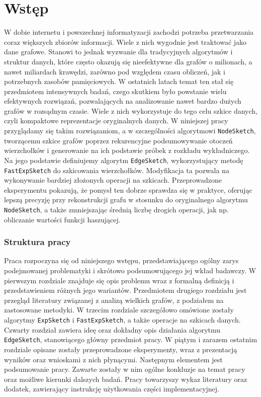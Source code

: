 \chapter*{Wstęp}

W dobie internetu i powszechnej informatyzacji zachodzi potrzeba przetwarzania coraz większych zbiorów informacji. Wiele z nich wygodnie jest traktować jako dane grafowe. Stanowi to jednak wyzwanie dla tradycyjnych algorytmów i struktur danych, które często okazują się nieefektywne dla grafów o milionach, a nawet miliardach krawędzi, zarówno pod względem czasu obliczeń, jak i potrzebnych zasobów pamięciowych.
W ostatnich latach temat ten stał się przedmiotem intensywnych badań, czego skutkiem było powstanie wielu efektywnych rozwiązań, pozwalających na analizowanie nawet bardzo dużych grafów w rozsądnym czasie. Wiele z nich wykorzystuje do tego celu szkice danych, czyli kompaktowe reprezentacje oryginalnych danych. W niniejszej pracy przyglądamy się takim rozwiązaniom, a w szczególności algorytmowi \texttt{NodeSketch}, tworzącemu szkice grafów poprzez rekurencyjne podsumowywanie otoczeń wierzchołków i generowanie na ich podstawie próbek z rozkładu wykładniczego. Na jego podstawie definiujemy algorytm \texttt{EdgeSketch}, wykorzystujący metodę \texttt{FastExpSketch} do szkicowania wierzchołków. Modyfikacja ta pozwala na wykonywanie bardziej złożonych operacji na szkicach. Przeprowadzone eksperymentu pokazują, że pomysł ten dobrze sprawdza się w praktyce, oferując lepszą precyzję przy rekonstrukcji grafu w stosunku do oryginalnego algorytmu \texttt{NodeSketch}, a także zmniejszając średnią liczbę drogich operacji, jak np. obliczanie wartości funkcji haszującej.   

\subsection*{Struktura pracy}
Praca rozpoczyna się od niniejszego wstępu, przedstawiającego ogólny zarys podejmowanej problematyki i skrótowo podsumowującego jej wkład badawczy. W pierwszym rozdziale znajduje się opis problemu wraz z formalną definicją i przedstawieniem różnych jego wariantów. Przedmiotem drugiego rozdziału jest przegląd literatury związanej z analizą wielkich grafów, z podziałem na zastosowane metodyki. W trzecim rozdziale szczegółowo omówione zostały algorytmy \texttt{ExpSketch} i \texttt{FastExpSketch}, a także operacje na szkicach danych. Czwarty rozdział zawiera ideę oraz dokładny opis działania algorytmu \texttt{EdgeSketch}, stanowiącego główny przedmiot pracy. W piątym i zarazem ostatnim rozdziale opisane zostały przeprowadzone eksperymenty, wraz z prezentacją wyników oraz wnioskami z nich płynącymi. Następnym elementem jest podsumowanie pracy. Zawarte zostały w nim ogólne konkluzje na temat pracy oraz możliwe kierunki dalszych badań. Pracy towarzyszy wykaz literatury oraz dodatek, zawierający instrukcję użytkowania części implementacyjnej. 
